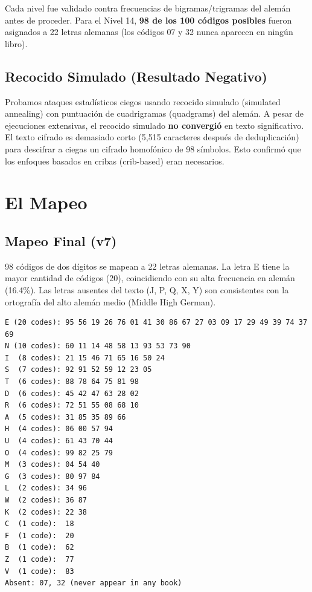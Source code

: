 \documentclass[11pt,a4paper]{article}
\begin{document}
Cada nivel fue validado contra frecuencias de bigramas/trigramas del alem\'{a}n antes de proceder. Para el Nivel 14, \textbf{98 de los 100 c\'{o}digos posibles} fueron asignados a 22 letras alemanas (los c\'{o}digos 07 y 32 nunca aparecen en ning\'{u}n libro).

\subsection{Recocido Simulado (Resultado Negativo)}

Probamos ataques estad\'{i}sticos ciegos usando recocido simulado (simulated annealing) con puntuaci\'{o}n de cuadrigramas (quadgrams) del alem\'{a}n. A pesar de ejecuciones extensivas, el recocido simulado \textbf{no convergi\'{o}} en texto significativo. El texto cifrado es demasiado corto (5,515 caracteres despu\'{e}s de deduplicaci\'{o}n) para descifrar a ciegas un cifrado homof\'{o}nico de 98 s\'{i}mbolos. Esto confirm\'{o} que los enfoques basados en cribas (crib-based) eran necesarios.

\section{El Mapeo}

\subsection{Mapeo Final (v7)}

98 c\'{o}digos de dos d\'{i}gitos se mapean a 22 letras alemanas. La letra E tiene la mayor cantidad de c\'{o}digos (20), coincidiendo con su alta frecuencia en alem\'{a}n (16.4\%). Las letras ausentes del texto (J, P, Q, X, Y) son consistentes con la ortograf\'{i}a del alto alem\'{a}n medio (Middle High German).

\begin{lstlisting}[style=plain]
E (20 codes): 95 56 19 26 76 01 41 30 86 67 27 03 09 17 29 49 39 74 37 69
N (10 codes): 60 11 14 48 58 13 93 53 73 90
I  (8 codes): 21 15 46 71 65 16 50 24
S  (7 codes): 92 91 52 59 12 23 05
T  (6 codes): 88 78 64 75 81 98
D  (6 codes): 45 42 47 63 28 02
R  (6 codes): 72 51 55 08 68 10
A  (5 codes): 31 85 35 89 66
H  (4 codes): 06 00 57 94
U  (4 codes): 61 43 70 44
O  (4 codes): 99 82 25 79
M  (3 codes): 04 54 40
G  (3 codes): 80 97 84
L  (2 codes): 34 96
W  (2 codes): 36 87
K  (2 codes): 22 38
C  (1 code):  18
F  (1 code):  20
B  (1 code):  62
Z  (1 code):  77
V  (1 code):  83
Absent: 07, 32 (never appear in any book)
\end{lstlisting}
\end{document}
